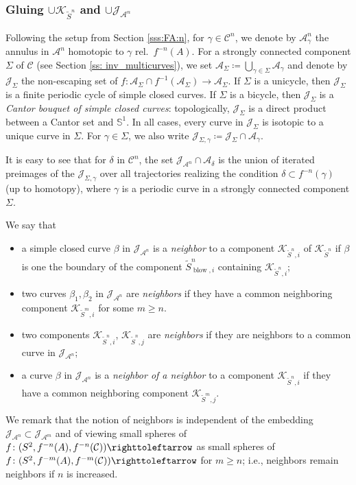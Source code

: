 \documentclass{amsart}
\theoremstyle{plain}
\theoremstyle{definition}
\theoremstyle{remark}
\renewcommand{\AA}{{\mathcal A}}
\newcommand{\blowup}{{\operatorname{blow}}}
\newcommand{\filled}{{\mathcal K}}
\newcommand{\reminder}[1]{\textsl{$\lhd\rhd$#1$\lhd\rhd$}\marginpar{$\lhd\rhd\lhd\rhd\lhd\rhd$}}%
\newcommand{\hide}[1]{}
\newcommand{\Jul}{{\mathcal J}}
\newcommand{\CC}{{\mathcal C}}
\newcommand\selfmap{\righttoleftarrow}
\begin{document}
\subsubsection{Gluing $\cup \filled_{\widetilde S^n}$ and $\cup \Jul_{\AA^n}$}\label{sss:glunig of S^n A^n}
Following the setup from Section  \ref{sss:FA:n}, for $\gamma\in \CC^n$, we denote by $\AA^n_\gamma$ the annulus in $\AA^n$ homotopic to $\gamma$ rel.\ $f^{-n}(A)$. For a strongly connected component $\Sigma$ of $\CC$ (see Section \ref{ss: inv_multicurves}), we set $\AA_\Sigma\coloneq \displaystyle \bigcup_{\gamma\in \Sigma} \AA_\gamma$ and denote by $\Jul_\Sigma$ the non-escaping set of $f\colon \AA_\Sigma\cap f^{-1}(\AA_\Sigma)\to \AA_\Sigma$. If $\Sigma$ is a unicycle, then $\Jul_\Sigma$ is a finite periodic cycle of simple closed curves. If $\Sigma$ is a bicycle, then $\Jul_\Sigma$ is a \emph{Cantor bouquet of simple closed curves}: topologically, $\Jul_\Sigma$ is a direct product between a Cantor set and $\mathbb{S}^1$. In all cases, every curve in $\Jul_\Sigma$ is isotopic to a unique curve in $\Sigma$. For $\gamma\in \Sigma$, we also write $\Jul_{\Sigma, \gamma}\coloneq \Jul_\Sigma\cap \AA_\gamma$.


It is easy to see that for $\delta$ in $\CC^n$, the set $\Jul_{\AA^n}\cap \AA_\delta$ is the union of iterated preimages of the $\Jul_{\Sigma, \gamma}$ over all trajectories realizing the condition $\delta \subset f^{-n}(\gamma)$ (up to homotopy), where $\gamma$ is a periodic curve in a strongly connected component $\Sigma$.


We say that 
\begin{itemize}
 \item a simple closed curve $\beta$ in $\Jul_{\AA^n}$ is a \emph{neighbor} to a component $\filled_{\widetilde S^n, i}$ of $\filled_{\widetilde S^n}$ if $\beta $ is one the boundary of the component $\widetilde S_{\blowup, i}^n$ containing $\filled_{\widetilde S^n, i}$;
\item two curves $\beta_1,\beta_2$ in $\Jul_{\AA^n}$ are \emph{neighbors} if they have a common neighboring component $\filled_{\widetilde S^m, i}$ for some $m\ge n$.
\item two components $\filled_{\widetilde S^n, i}$, $\filled_{\widetilde S^n, j}$ are \emph{neighbors} if they are neighbors to a common curve in $\Jul_{\AA^n}$;
\item a curve $\beta$ in $\Jul_{\AA^n}$ is a \emph{neighbor of a neighbor} to a component $\filled_{\widetilde S^n, i}$ if they have a common neighboring component $\filled_{\widetilde S^m, j}$. 
\end{itemize}
We remark that the notion of neighbors is independent of the embedding $\Jul_{\AA^n}\subset \Jul_{\AA^m}$ and of viewing small spheres of $f\colon (S^2,f^{-n}(A),f^{-n}(\CC))\selfmap$ as small spheres of $f\colon (S^2,f^{-m}(A),f^{-m}(\CC))\selfmap$ for $m\ge n$; i.e., neighbors remain neighbors if $n$ is increased.
\end{document}
